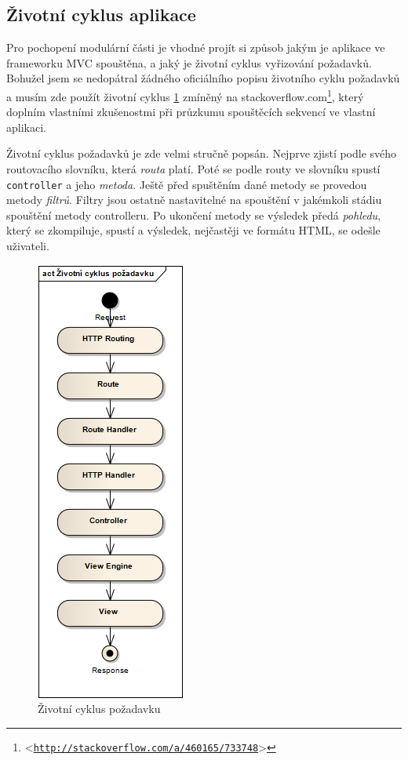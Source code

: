 \documentclass[11pt,twoside,a4paper]{book}
\let\oldUrl\url
\renewcommand\url[1]{<\texttt{\oldUrl{#1}}>}
\begin{document}
\subsection{Životní cyklus aplikace}
Pro pochopení modulární části je vhodné projít si způsob jakým je aplikace ve frameworku MVC spouštěna, a jaký je životní cyklus vyřizování požadavků. Bohužel jsem se nedopátral žádného oficiálního popisu životního cyklu požadavků a musím zde použít životní cyklus \ref{fig:lifecycle} zmíněný na stackoverflow.com\footnote{\url{http://stackoverflow.com/a/460165/733748}}, který doplním vlastními zkušenostmi při průzkumu spouštěcích sekvencí ve vlastní aplikaci. 

Životní cyklus požadavků je zde velmi stručně popsán. Nejprve zjistí podle svého routovacího slovníku, která \textit{routa} platí. Poté se podle routy ve slovníku spustí \texttt{controller} a jeho \textit{metoda}. Ještě před spuštěním dané metody se provedou metody \textit{filtrů}. Filtry jsou ostatně nastavitelné na spouštění v jakémkoli stádiu spouštění metody controlleru. Po ukončení metody se výsledek předá \textit{pohledu}, který se zkompiluje, spustí a výsledek, nejčastěji ve formátu HTML, se odešle uživateli.



\begin{figure}[h!]
\begin{center}
\includegraphics[scale=0.75]{figures/lifecycle}
\caption{Životní cyklus požadavku}
\label{fig:lifecycle}
\end{center}
\end{figure}
\end{document}
